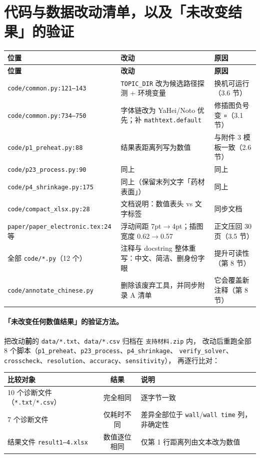 \documentclass[11pt,a4paper]{ctexart}
\newcommand{\src}[1]{\texttt{#1}}
\begin{document}
\section{代码与数据改动清单，以及「未改变结果」的验证}

\begin{center}
\small
\begin{longtable}{@{}p{}p{}p{}@{}}
\toprule
\textbf{位置} & \textbf{改动} & \textbf{原因} \\
\midrule
\endfirsthead
\toprule
\textbf{位置} & \textbf{改动} & \textbf{原因} \\
\midrule
\endhead
\bottomrule
\endfoot
\src{code/common.py:121--143} & \src{TOPIC\_DIR} 改为候选路径探测 + 环境变量 & 换机可运行（3.6 节） \\
\src{code/common.py:734--750} & 字体链改为 YaHei/Noto 优先；补 \src{mathtext.default} & 修插图负号变 \texttt{¤}（3.1 节） \\
\src{code/p1\_preheat.py:88} & 结果表距离列写为数值 & 与附件 3 模板一致（2.6 节） \\
\src{code/p23\_process.py:90} & 同上 & 同上 \\
\src{code/p4\_shrinkage.py:175} & 同上（保留末列文字「药材表面」） & 同上 \\
\src{code/compact\_xlsx.py:28} & 文档说明：数值表头 vs 文字标签 & 同步文档 \\
\src{paper/paper\_electronic.tex:24} 等 & 浮动间距 7pt$\to$4pt；插图宽度 0.62$\to$0.57 & 正文压回 30 页（3.5 节） \\
全部 \src{code/*.py}（12 个） & 注释与 docstring 整体重写：中文、简洁、删身份字眼 & 提升可读性（第 8 节） \\
\src{code/annotate\_chinese.py} & 删除该废弃工具，并同步附录 A 清单 & 它会覆盖新注释（第 8 节） \\
\end{longtable}
\end{center}

\paragraph{「未改变任何数值结果」的验证方法。}
把改动\textbf{前}的 \src{data/*.txt}、\src{data/*.csv} 归档在 \src{支持材料.zip} 内，
改动后重跑全部 8 个脚本（\src{p1\_preheat}、\src{p23\_process}、\src{p4\_shrinkage}、
\src{verify\_solver}、\src{crosscheck}、\src{resolution}、\src{accuracy}、\src{sensitivity}），
再逐行比对：

\begin{center}
\small
\begin{tabular}{@{}lcp{}@{}}
\toprule
\textbf{比较对象} & \textbf{结果} & \textbf{说明} \\
\midrule
10 个诊断文件（\src{*.txt}/\src{*.csv}） & 完全相同 & 逐字节一致 \\
7 个诊断文件 & 仅耗时不同 & 差异全部位于 \src{wall}/\src{wall time} 列，非确定性 \\
结果文件 \src{result1--4.xlsx} & 数值逐位相同 & 仅第 1 行距离列由文本改为数值 \\
\bottomrule
\end{tabular}
\end{center}
\end{document}
